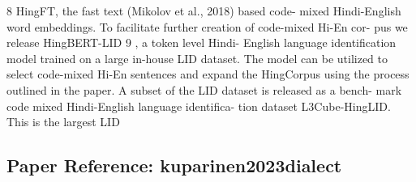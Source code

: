 8 HingFT, the fast text (Mikolov et al., 2018) based code- mixed Hindi-English word embeddings. To facilitate further creation of code-mixed Hi-En cor- pus we release HingBERT-LID 9 , a token level Hindi- English language identification model trained on a large in-house LID dataset. The model can be utilized to select code-mixed Hi-En sentences and expand the HingCorpus using the process outlined in the paper. A subset of the LID dataset is released as a bench- mark code mixed Hindi-English language identifica- tion dataset L3Cube-HingLID. This is the largest LID

\vspace{18pt}


\subsection*{Paper Reference: kuparinen2023dialect}


